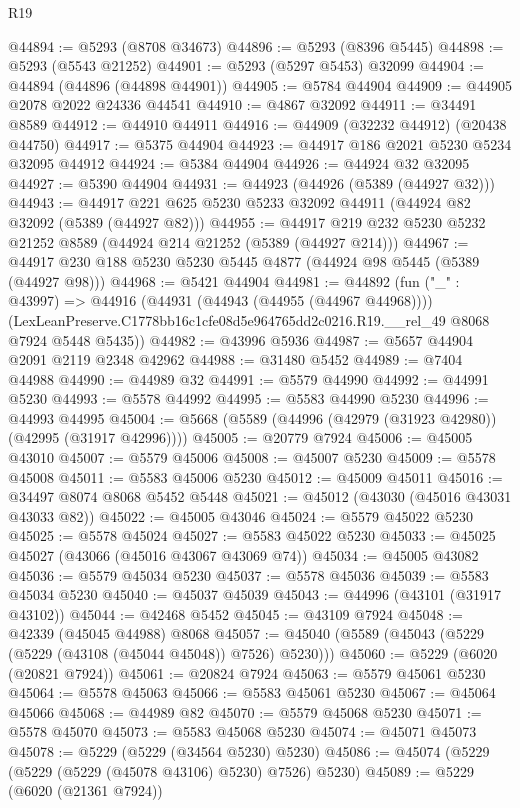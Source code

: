 \begin{lexlean}{R19}
\begin{coremodule}
@44894 := @5293 (@8708 @34673)
@44896 := @5293 (@8396 @5445)
@44898 := @5293 (@5543 @21252)
@44901 := @5293 (@5297 @5453) @32099
@44904 := @44894 (@44896 (@44898 @44901))
@44905 := @5784 @44904
@44909 := @44905 @2078 @2022 @24336 @44541
@44910 := @4867 @32092
@44911 := @34491 @8589
@44912 := @44910 @44911
@44916 := @44909 (@32232 @44912) (@20438 @44750)
@44917 := @5375 @44904
@44923 := @44917 @186 @2021 @5230 @5234 @32095 @44912
@44924 := @5384 @44904
@44926 := @44924 @32 @32095
@44927 := @5390 @44904
@44931 := @44923 (@44926 (@5389 (@44927 @32)))
@44943 := @44917 @221 @625 @5230 @5233 @32092 @44911 (@44924 @82 @32092 (@5389 (@44927 @82)))
@44955 := @44917 @219 @232 @5230 @5232 @21252 @8589 (@44924 @214 @21252 (@5389 (@44927 @214)))
@44967 := @44917 @230 @188 @5230 @5230 @5445 @4877 (@44924 @98 @5445 (@5389 (@44927 @98)))
@44968 := @5421 @44904
@44981 := @44892
    (fun ("_" : @43997) =>
    @44916
      (@44931 (@44943 (@44955 (@44967 @44968))))
      (LexLeanPreserve.C1778bb16c1cfe08d5e964765dd2c0216.R19.__rel_49 @8068 @7924 @5448 @5435))
@44982 := @43996 @5936
@44987 := @5657 @44904 @2091 @2119 @2348 @42962
@44988 := @31480 @5452
@44989 := @7404 @44988
@44990 := @44989 @32
@44991 := @5579 @44990
@44992 := @44991 @5230
@44993 := @5578 @44992
@44995 := @5583 @44990 @5230
@44996 := @44993 @44995
@45004 := @5668 (@5589 (@44996 (@42979 (@31923 @42980)) (@42995 (@31917 @42996))))
@45005 := @20779 @7924
@45006 := @45005 @43010
@45007 := @5579 @45006
@45008 := @45007 @5230
@45009 := @5578 @45008
@45011 := @5583 @45006 @5230
@45012 := @45009 @45011
@45016 := @34497 @8074 @8068 @5452 @5448
@45021 := @45012 (@43030 (@45016 @43031 @43033 @82))
@45022 := @45005 @43046
@45024 := @5579 @45022 @5230
@45025 := @5578 @45024
@45027 := @5583 @45022 @5230
@45033 := @45025 @45027 (@43066 (@45016 @43067 @43069 @74))
@45034 := @45005 @43082
@45036 := @5579 @45034 @5230
@45037 := @5578 @45036
@45039 := @5583 @45034 @5230
@45040 := @45037 @45039
@45043 := @44996 (@43101 (@31917 @43102))
@45044 := @42468 @5452
@45045 := @43109 @7924
@45048 := @42339 (@45045 @44988) @8068
@45057 := @45040 (@5589 (@45043 (@5229 (@5229 (@43108 (@45044 @45048)) @7526) @5230)))
@45060 := @5229 (@6020 (@20821 @7924))
@45061 := @20824 @7924
@45063 := @5579 @45061 @5230
@45064 := @5578 @45063
@45066 := @5583 @45061 @5230
@45067 := @45064 @45066
@45068 := @44989 @82
@45070 := @5579 @45068 @5230
@45071 := @5578 @45070
@45073 := @5583 @45068 @5230
@45074 := @45071 @45073
@45078 := @5229 (@5229 (@34564 @5230) @5230)
@45086 := @45074 (@5229 (@5229 (@5229 (@45078 @43106) @5230) @7526) @5230)
@45089 := @5229 (@6020 (@21361 @7924))

\end{coremodule}
\end{lexlean}
